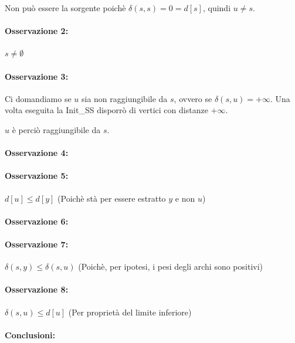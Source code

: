 \documentclass[tikz]{article}
\let\oldparagraph\paragraph
\renewcommand{\paragraph}[1]{\oldparagraph{#1}\mbox{}}
\begin{document}
{{{Non può essere la sorgente poichè $\delta(s,s)=0=d[s]$, quindi $u\neq s$.}

\paragraph{Osservazione 2:}

$s \neq \emptyset$

\paragraph{Osservazione 3:}

Ci domandiamo se $u$ sia non raggiungibile da $s$, ovvero se $\delta(s,u)=+\infty$.
Una volta eseguita la Init\_SS disporrò di vertici con distanze $+\infty$.

$u$ è perciò raggiungibile da $s$.

\paragraph{Osservazione 4:}

\paragraph{Osservazione 5:}

$d[u] \leq d[y]$ (Poichè stà per essere estratto $y$ e non $u$)

\paragraph{Osservazione 6:}

\paragraph{Osservazione 7:}

$\delta(s,y) \leq \delta(s,u)$ (Poichè, per ipotesi, i pesi degli archi sono positivi)

\paragraph{Osservazione 8:}

$\delta(s,u) \leq d[u]$ (Per proprietà del limite inferiore)

\paragraph{Conclusioni:}

}}
\end{document}

